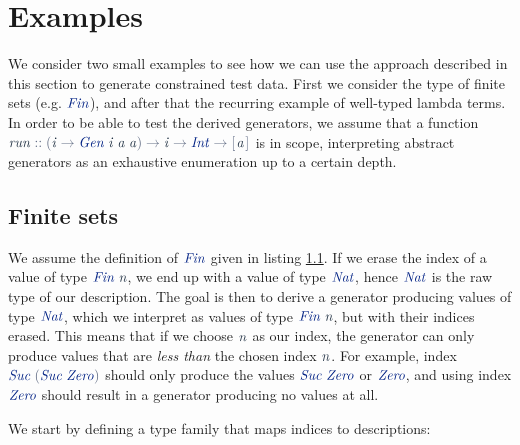 \documentclass[a4paper,msc,twosized=semi]{uustthesis}
\let\oldemph\emph
\renewcommand\emph[1]{{\large\oldemph{#1}}}
\newcommand*{\mathcolor}{}
\def\mathcolor#1#{\mathcoloraux{#1}}
\newcommand*{\mathcoloraux}[3]{%
  \protect\leavevmode
  \begingroup
    \color#1{#2}#3%
  \endgroup
}
\newcommand{\HSSpecial}[1]{\mathcolor{hsblue4}{#1}}
\newcommand{\HSSym}[1]{\mathcolor{hsblue4}{#1}}
\newcommand{\HSCon}[1]{\mathcolor{hsblue3}{\mathit{#1}}}
\newcommand{\HSVar}[1]{\mathcolor{hsblue5}{\mathit{#1}}}
\begin{document}
\section{Examples}

  We consider two small examples to see how we can use the approach described in this 
  section to generate constrained test data. First we consider the type of finite sets 
  (e.g. \ensuremath{\HSCon{Fin}}), and after that the recurring example of well-typed lambda terms. In 
  order to be able to test the derived generators, we assume that a function \ensuremath{\HSVar{run}\HSSym{::}\HSSpecial{(}\HSVar{i}\HSSym{\to} \HSCon{Gen}\;\HSVar{i}\;\HSVar{a}\;\HSVar{a}\HSSpecial{)}\HSSym{\to} \HSVar{i}\HSSym{\to} \HSCon{Int}\HSSym{\to} \HSSpecial{\HSSym{[\mskip1.5mu} }\HSVar{a}\HSSpecial{\HSSym{\mskip1.5mu]}}} is in scope, interpreting abstract generators 
  as an exhaustive enumeration up to a certain depth. 

\subsection{Finite sets}

  We assume the definition of \ensuremath{\HSCon{Fin}} given in listing \ref{}. If we erase the index of 
  a value of type \ensuremath{\HSCon{Fin}\;\HSVar{n}}, we end up with a value of type \ensuremath{\HSCon{Nat}}, hence \ensuremath{\HSCon{Nat}} is the 
  raw type of our description. The goal is then to derive a generator producing values 
  of type \ensuremath{\HSCon{Nat}}, which we interpret as values of type \ensuremath{\HSCon{Fin}\;\HSVar{n}}, but with their indices 
  erased. This means that if we choose \ensuremath{\HSVar{n}} as our index, the generator can only 
  produce values that are \emph{less than} the chosen index \ensuremath{\HSVar{n}}. For example, index \ensuremath{\HSCon{Suc}\;\HSSpecial{(}\HSCon{Suc}\;\HSCon{Zero}\HSSpecial{)}} should only produce the values \ensuremath{\HSCon{Suc}\;\HSCon{Zero}} or \ensuremath{\HSCon{Zero}}, and using index 
  \ensuremath{\HSCon{Zero}} should result in a generator producing no values at all. 

  We start by defining a type family that maps indices to descriptions: 
\end{document}
